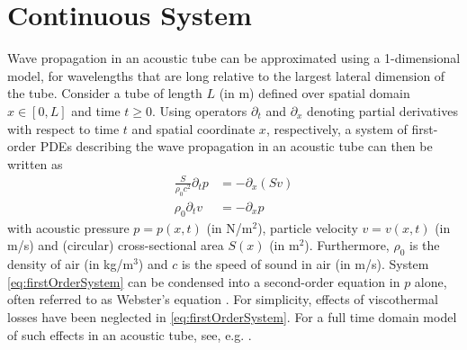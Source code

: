\section{Continuous System}\label{sec:continuous}
Wave propagation in an acoustic tube can be approximated using a 1-dimensional model, for wavelengths that are long relative to the largest lateral dimension of the tube. Consider a tube of  length $L$ \SWcomment[$=L(t)$] (in m) defined over spatial domain $x\in [0, L]$ and time $t\geq 0$. Using operators $\partial_t$ and $\partial_x$ denoting partial derivatives with respect to time $t$ and spatial coordinate $x$, respectively, a system of first-order PDEs describing the wave propagation in an acoustic tube can then be written as
\begin{subequations}\label{eq:firstOrderSystem}
    \begin{align}
        \frac{S}{\rho_0 c^2}\partial_t p &= -\partial_x(Sv)\label{eq:contPressure}\\
        \rho_0\partial_tv &= -\partial_xp\label{eq:contVelocity}
    \end{align}
\end{subequations}
with acoustic pressure $p = p(x,t)$ (in N/m$^2$), particle velocity $v = v(x,t)$ (in m/s) and (circular) cross-sectional area $S(x)$ (in m$^2$). Furthermore, $\rho_0$ is the density of air (in kg/m$^3$) and $c$ is the speed of sound in air (in m/s). System \eqref{eq:firstOrderSystem} can be condensed into a second-order equation in $p$ alone, often referred to as Webster's equation \cite{Webster19}.   For simplicity, effects of viscothermal losses have been neglected in \eqref{eq:firstOrderSystem}. For a full time domain model of such effects in an acoustic tube, see, e.g. \cite{Bilbao2016}. 

